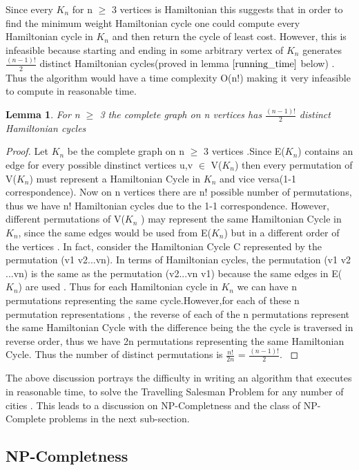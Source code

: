 \documentclass{article}
\newtheorem{lemma}[definition]{Lemma}
\begin{document}
Since every $K_n$ for n $\geq$ 3 vertices is Hamiltonian this suggests that in order to find the minimum weight Hamiltonian cycle one could compute every Hamiltonian cycle in $K_n$ and then return the cycle of least cost. However, this is infeasible because starting and ending in some arbitrary vertex of $K_n$ generates $\frac{(n-1)!}{2}$ distinct Hamiltonian cycles(proved in  lemma $\ref{running_time}$ below) . Thus the algorithm would have a time complexity O(n!) making it very infeasible to compute in reasonable time.\cite{geeksforgeeks_2018}
\begin{lemma}
\label{running_time}
For n $\geq$ 3 the complete graph on n vertices has $\frac{(n-1)!}{2}$ distinct Hamiltonian cycles
\end{lemma}
\begin{proof}
Let $K_n$ be the complete graph on n $\geq$ 3 vertices .Since E($K_n$) contains an edge for every possible dinstinct vertices u,v $\in$ V($K_n$) then every permutation of V($K_n$) must represent a Hamiltonian Cycle in $K_n$ and vice versa(1-1 correspondence). Now on n vertices there are n! possible number of permutations, thus we have n! Hamiltonian cycles due to the 1-1 correspondence. However, different permutations of V($K_n$ ) may represent the same Hamiltonian Cycle in $K_n$, since the same edges would be used from E($K_n$) but in a different order of the vertices . In fact, consider the Hamiltonian Cycle C represented by the permutation (v1 v2...vn). In terms of Hamiltonian cycles, the permutation (v1 v2 ...vn) is the same as the permutation (v2...vn v1) because the same edges in E($K_n$) are used . Thus for each Hamiltonian cycle in $K_n$ we can have n permutations representing the same cycle.However,for each of these n permutation representations , the reverse of each of the n permutations represent the same Hamiltonian Cycle with the difference being the the cycle is traversed in reverse order, thus we have 2n permutations representing the same Hamiltonian Cycle. Thus the number of distinct permutations is $\frac{n!}{2n}$ = $\frac{(n-1)!}{2}$. \cite{mathematics_stack_exchange_2012}
\end{proof}
The above discussion portrays the difficulty in writing an algorithm that executes in reasonable time, to solve the Travelling Salesman Problem for any number of cities . This leads to a discussion on NP-Completness and the class of NP-Complete problems in the next sub-section. 
\subsection{NP-Completness}
\newpage{}


\end{document}
